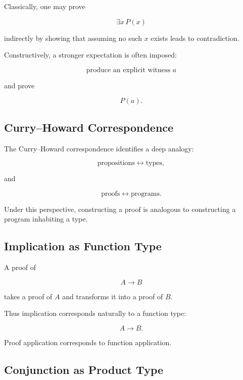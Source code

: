 Classically, one may prove

\[
\exists x\,P(x)
\]

indirectly by showing that assuming no such \(x\) exists leads to
contradiction.

Constructively, a stronger expectation is often imposed:

\[
\boxed{
\text{produce an explicit witness }a
}
\]

and prove

\[
\boxed{
P(a).
}
\]

\subsection{Curry--Howard Correspondence}
\label{subsec:curry-howard}

The Curry--Howard correspondence identifies a deep analogy:

\[
\boxed{
\text{propositions}
\leftrightarrow
\text{types},
}
\]

and

\[
\boxed{
\text{proofs}
\leftrightarrow
\text{programs}.
}
\]

Under this perspective, constructing a proof is analogous to constructing
a program inhabiting a type.

\subsection{Implication as Function Type}
\label{subsec:implication-function-type}

A proof of

\[
A\rightarrow B
\]

takes a proof of \(A\) and transforms it into a proof of \(B\).

Thus implication corresponds naturally to a function type:

\[
\boxed{
A\rightarrow B.
}
\]

Proof application corresponds to function application.

\subsection{Conjunction as Product Type}
\label{subsec:conjunction-product-type}

